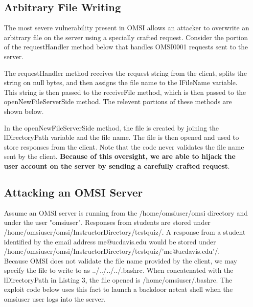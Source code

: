 \subsection*{Arbitrary File Writing}
The most severe vulnerability present in OMSI allows an attacker to overwrite an arbitrary file on the server using a specially crafted request.  Consider the portion of the requestHandler method below that handles OMSI0001 requests sent to the server.  



The requestHandler method receives the request string from the client, splits the string on null bytes, and then assigns the file name to the lFileName variable.  This string is then passed to the receiveFile method, which is then passed to the openNewFileServerSide method.  The relevent portions of these methods are shown below.  


\break


In the openNewFileServerSide method, the file is created by joining the lDirectoryPath variable and the file name.  The file is then opened and used to store responses from the client.  Note that the code never validates the file name sent by the client.  \textbf{Because of this oversight, we are able to hijack the user account on the server by sending a carefully crafted request}.  

\subsection*{Attacking an OMSI Server}
Assume an OMSI server is running from the /home/omsiuser/omsi directory and under the user "omsiuser".  Responses from students are stored under /home/omsiuser/omsi/InstructorDirectory/testquiz/.  A response from a student identified by the email address me@ucdavis.edu would be stored under /home/omsiuser/omsi/InstructorDirectory/testquiz/'me@ucdavis.edu'/. \\ 

Because OMSI does not validate the file name provided by the client, we may specify the file to write to as  ../../../../.bashrc.  When concatenated with the lDirectoryPath in Listing 3, the file opened is /home/omsiuser/.bashrc.  The exploit code below uses this fact to launch a backdoor netcat shell when the omsiuser user logs into the server.  

